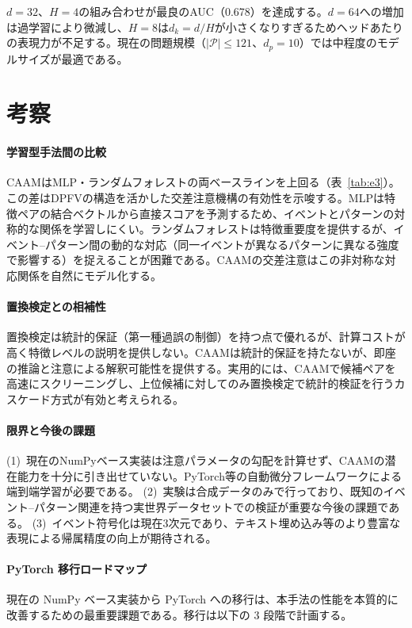 \documentclass[sigconf,nonacm]{acmart}
\begin{document}
$d = 32$、$H = 4$の組み合わせが最良のAUC（0.678）を達成する。$d = 64$への増加は過学習により微減し、$H = 8$は$d_k = d/H$が小さくなりすぎるためヘッドあたりの表現力が不足する。現在の問題規模（$|\mathcal{P}| \leq 121$、$d_p = 10$）では中程度のモデルサイズが最適である。

\section{考察}
\label{sec:discussion}

\paragraph{学習型手法間の比較}
CAAMはMLP・ランダムフォレストの両ベースラインを上回る（表~\ref{tab:e3}）。この差はDPFVの構造を活かした交差注意機構の有効性を示唆する。MLPは特徴ペアの結合ベクトルから直接スコアを予測するため、イベントとパターンの対称的な関係を学習しにくい。ランダムフォレストは特徴重要度を提供するが、イベント--パターン間の動的な対応（同一イベントが異なるパターンに異なる強度で影響する）を捉えることが困難である。CAAMの交差注意はこの非対称な対応関係を自然にモデル化する。

\paragraph{置換検定との相補性}
置換検定は統計的保証（第一種過誤の制御）を持つ点で優れるが、計算コストが高く特徴レベルの説明を提供しない。CAAMは統計的保証を持たないが、即座の推論と注意による解釈可能性を提供する。実用的には、CAAMで候補ペアを高速にスクリーニングし、上位候補に対してのみ置換検定で統計的検証を行うカスケード方式が有効と考えられる。

\paragraph{限界と今後の課題}
(1)~現在のNumPyベース実装は注意パラメータの勾配を計算せず、CAAMの潜在能力を十分に引き出せていない。PyTorch等の自動微分フレームワークによる端到端学習が必要である。
(2)~実験は合成データのみで行っており、既知のイベント--パターン関連を持つ実世界データセットでの検証が重要な今後の課題である。
(3)~イベント符号化は現在3次元であり、テキスト埋め込み等のより豊富な表現による帰属精度の向上が期待される。

\paragraph{PyTorch 移行ロードマップ}
現在の NumPy ベース実装から PyTorch への移行は、本手法の性能を本質的に改善するための最重要課題である。移行は以下の 3 段階で計画する。
\end{document}
